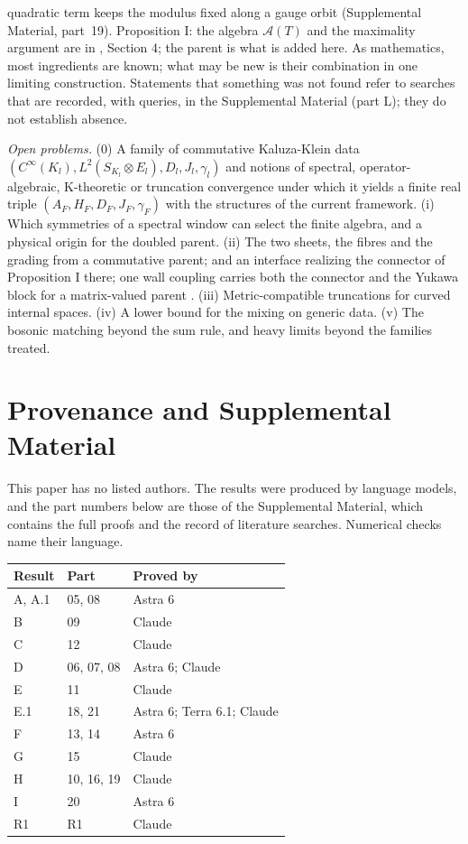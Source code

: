 \documentclass[aps,prd,reprint,onecolumn,nofootinbib,amsmath,amssymb,floatfix]{revtex4-2}
\theoremstyle{plain}
\newcommand{\supp}[1]{Supplemental Material, part~#1}
\begin{document}
quadratic term keeps the modulus fixed along a gauge orbit (\supp{19}). Proposition I: the algebra $\mathcal A(T)$ and the maximality argument are in \cite{CC2008}, Section 4; the parent is what is added here. As mathematics, most ingredients are known; what may be new is their combination in one limiting construction. Statements that something was not found refer to searches that are recorded, with queries, in the Supplemental Material (part L); they do not establish absence.

\emph{Open problems.} (0) A family of commutative Kaluza-Klein data $(C^\infty(K_l),L^2(S_{K_l}\otimes E_l),D_l,J_l,\gamma_l)$ and notions of spectral, operator-algebraic, K-theoretic or truncation convergence under which it yields a finite real triple $(A_F,H_F,D_F,J_F,\gamma_F)$ with the structures of the current framework. (i) Which symmetries of a spectral window can select the finite algebra, and a physical origin for the doubled parent. (ii) The two sheets, the fibres and the grading from a commutative parent; and an interface realizing the connector of Proposition I there; one wall coupling carries both the connector and the Yukawa block for a matrix-valued parent \cite{boundarynote}. (iii) Metric-compatible truncations for curved internal spaces. (iv) A lower bound for the mixing on generic data. (v) The bosonic matching beyond the sum rule, and heavy limits beyond the families treated.

\section*{Provenance and Supplemental Material}

This paper has no listed authors. The results were produced by language models, and the part numbers below are those of the Supplemental Material, which contains the full proofs and the record of literature searches. Numerical checks name their language.

\begin{table}[h]
\begin{ruledtabular}
\begin{tabular}{p{50pt}p{60pt}p{110pt}}
Result & Part & Proved by\\ \hline
A, A.1 & 05, 08 & Astra 6\\
B & 09 & Claude\\
C & 12 & Claude\\
D & 06, 07, 08 & Astra 6; Claude\\
E & 11 & Claude\\
E.1 & 18, 21 & Astra 6; Terra 6.1; Claude\\
F & 13, 14 & Astra 6\\
G & 15 & Claude\\
H & 10, 16, 19 & Claude\\
I & 20 & Astra 6\\
R1 & R1 & Claude
\end{tabular}
\end{ruledtabular}
\end{table}


\end{document}

